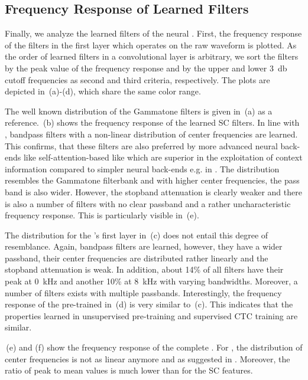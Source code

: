 \documentclass{INTERSPEECH2023}
\begin{document}
\subsection{Frequency Response of Learned Filters}
\label{sec:freq_resp}
Finally, we analyze the learned filters of the neural \fes.
First, the frequency response of the filters in the first layer which operates on the raw waveform is plotted.
As the order of learned filters in a convolutional layer is arbitrary, we sort the filters by the peak value of the frequency response and by the upper and lower \SI{3}{\decibel} cutoff frequencies as second and third criteria, respectively.
The plots are depicted in \,(a)-(d), which share the same color range.

The well known distribution of the Gammatone filters is given in \,(a) as a reference.
\,(b) shows the frequency response of the learned \gls{SC} filters.
In line with \cite{tuske2018:waveform}, bandpass filters with a non-linear distribution of center frequencies are learned.
This confirms, that these filters are also preferred by more advanced neural back-ends like self-attention-based like \conformer which are superior in the exploitation of context information compared to simpler neural back-ends e.g. in \cite{tuske2014raw}.
The distribution resembles the Gammatone filterbank and with higher center frequencies, the pass band is also wider.
However, the stopband attenuation is clearly weaker and there is also a number of filters with no clear passband and a rather uncharacteristic frequency response.
This is particularly visible in \,(e).

The distribution for the \wvtwo \fe's first layer in \,(c) does not entail this degree of resemblance.
Again, bandpass filters are learned, however, they have a wider passband, their center frequencies are distributed rather linearly and the stopband attenuation is weak.
In addition, about 14\% of all filters have their peak at \SI{0}{\kilo\hertz} and another 10\% at \SI{8}{\kilo\hertz} with varying bandwidths.
Moreover, a number of filters exists with multiple passbands.
Interestingly, the frequency response of the pre-trained \wvtwo \fe in \,(d) is very similar to \,(c).
This indicates that the properties learned in unsupervised pre-training and supervised \gls{CTC} training are similar.

\,(e) and (f) show the frequency response of the complete \fe.
For \wvtwo, the distribution of center frequencies is not as linear anymore and as suggested in \cite{choi2022w2v2fe}.
Moreover, the ratio of peak to mean values is much lower than for the \gls{SC} features.
\end{document}
